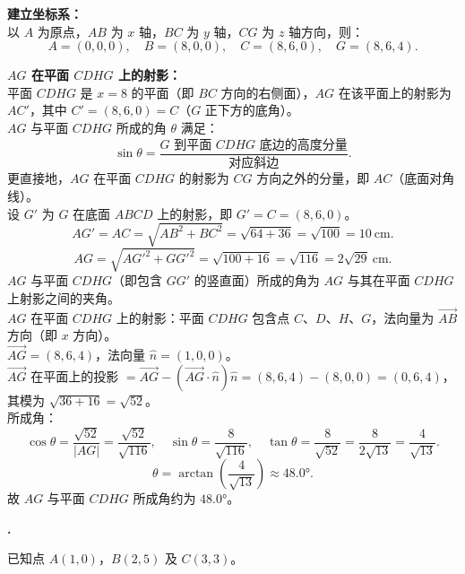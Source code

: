\documentclass[12pt,a4paper]{ctexart}
\newcounter{qnum}
\newenvironment{question}
  {%
    \stepcounter{qnum}%
    \vspace{0.8em}%
    \noindent\textbf{\theqnum.}\enspace
  }
  {\par\vspace{0.4em}}
\newenvironment{solution}
  {%
    \par\noindent
  }
  {\par}
\begin{document}
\begin{solution}
    \textbf{建立坐标系：} \\
    以 $A$ 为原点，$AB$ 为 $x$ 轴，$BC$ 为 $y$ 轴，$CG$ 为 $z$ 轴方向，则：
    \[
        A = (0,0,0),\quad B=(8,0,0),\quad C=(8,6,0),\quad G=(8,6,4).
    \]

    \textbf{$AG$ 在平面 $CDHG$ 上的射影：} \\
    平面 $CDHG$ 是 $x=8$ 的平面（即 $BC$ 方向的右侧面），$AG$ 在该平面上的射影为 $AC'$，其中 $C' = (8,6,0) = C$（$G$ 正下方的底角）。\\
    $AG$ 与平面 $CDHG$ 所成的角 $\theta$ 满足：
    \[
        \sin\theta = \frac{\text{$G$ 到平面 $CDHG$ 底边的高度分量}}{\text{对应斜边}}.
    \]
    更直接地，$AG$ 在平面 $CDHG$ 的射影为 $CG$ 方向之外的分量，即 $AC$（底面对角线）。\\

    设 $G'$ 为 $G$ 在底面 $ABCD$ 上的射影，即 $G' = C = (8,6,0)$。\\
    \[
        AG' = AC = \sqrt{AB^2 + BC^2} = \sqrt{64+36} = \sqrt{100} = 10\ \text{cm}.
    \]
    \[
        AG = \sqrt{AG'^2 + GG'^2} = \sqrt{100 + 16} = \sqrt{116} = 2\sqrt{29}\ \text{cm}.
    \]
    $AG$ 与平面 $CDHG$（即包含 $GG'$ 的竖直面）所成的角为 $AG$ 与其在平面 $CDHG$ 上射影之间的夹角。\\

    $AG$ 在平面 $CDHG$ 上的射影：平面 $CDHG$ 包含点 $C、D、H、G$，法向量为 $\overrightarrow{AB}$ 方向（即 $x$ 方向）。\\
    $\overrightarrow{AG} = (8,6,4)$，法向量 $\hat{n} = (1,0,0)$。\\
    $\overrightarrow{AG}$ 在平面上的投影 $= \overrightarrow{AG} - (\overrightarrow{AG}\cdot\hat{n})\hat{n} = (8,6,4)-(8,0,0) = (0,6,4)$，其模为 $\sqrt{36+16}=\sqrt{52}$。\\
    所成角：
    \[
        \cos\theta = \frac{\sqrt{52}}{|AG|} = \frac{\sqrt{52}}{\sqrt{116}},\quad
        \sin\theta = \frac{8}{\sqrt{116}},\quad
        \tan\theta = \frac{8}{\sqrt{52}} = \frac{8}{2\sqrt{13}} = \frac{4}{\sqrt{13}}.
    \]
    \[
        \theta = \arctan\!\left(\frac{4}{\sqrt{13}}\right) \approx 48.0°.
    \]
    故 $AG$ 与平面 $CDHG$ 所成角约为 $\mathbf{48.0°}$。
\end{solution}

\begin{question}
    已知点 $A(1,0)$，$B(2,5)$ 及 $C(3,3)$。
\end{question}
\end{document}
